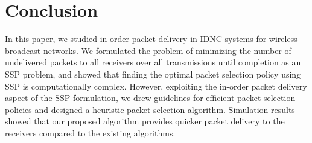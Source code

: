 \documentclass[12pt, peerreview, onecolumn]{IEEEtran}
\begin{document}
\section{Conclusion} \label{conclusion}
In this paper, we studied  in-order packet delivery  in  IDNC systems for  wireless broadcast networks.  We formulated the problem of  minimizing the  number of undelivered packets to all receivers over all transmissions until completion as  an SSP problem, and  showed that finding the optimal packet selection policy using SSP is computationally complex.  However, exploiting the in-order packet delivery aspect of the SSP formulation, we  drew  guidelines for   efficient  packet selection policies and  designed  a  heuristic packet selection algorithm.   Simulation results showed  that  our proposed   algorithm  provides quicker packet delivery  to the receivers compared to the  existing algorithms.

\vspace{-5mm}







\newpage
\end{document}

